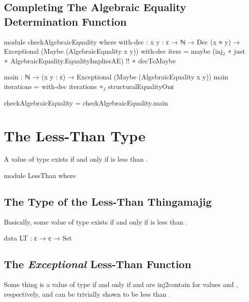 \documentclass{report}
\begin{document}

\section{Completing The Algebraic Equality Determination Function}

\begin{code}
  module checkAlgebraicEquality where
    with-dec : {x y : ε} →
               ℕ →
               Dec (x ≡ y) →
               Exceptional (Maybe (AlgebraicEquality x y))
    with-dec iters = maybe (inj₂ ∘ just ∘ AlgebraicEquality.EqualityImpliesAE)
                           {!!}
                   ∘ decToMaybe

    main : ℕ → (x y : ε) → Exceptional (Maybe (AlgebraicEquality x y))
    main iterations = with-dec iterations ∘₂ structuralEqualityOnε

  checkAlgebraicEquality = checkAlgebraicEquality.main
\end{code}

\chapter{The Less-Than Type}
A value of type    exists if and only if  is less than .

\begin{code}
  module LessThan where
\end{code}

\section{The Type of the Less-Than Thingamajig}
Basically, some value of type    exists if and only if  is less than .

\begin{code}
    data LT : ε → ε → Set
\end{code}

\section{The \emph{Exceptional} Less-Than Function}
Some thing is a value of type    if and only if  and  are \gls{inj2contain} for values  and , respectively, and  can be trivially shown to be less than .
\end{document}

